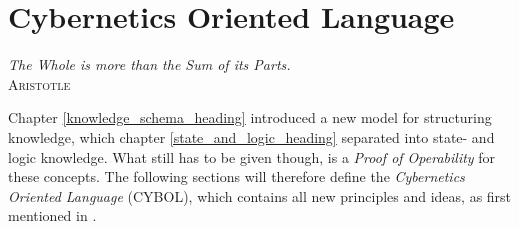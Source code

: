%
%
%
%
%
%
%

\chapter{Cybernetics Oriented Language}
\label{cybernetics_oriented_language_heading}

\begin{flushright}
    \textsl{The Whole is more than the Sum of its Parts.}\\
    \textsc{Aristotle}
\end{flushright}

Chapter \ref{knowledge_schema_heading} introduced a new model for structuring
knowledge, which chapter \ref{state_and_logic_heading} separated into state-
and logic knowledge. What still has to be given though, is a
\emph{Proof of Operability} for these concepts. The following sections will
therefore define the \emph{Cybernetics Oriented Language} (CYBOL), which
contains all new principles and ideas, as first mentioned in \cite{heller2004}.






